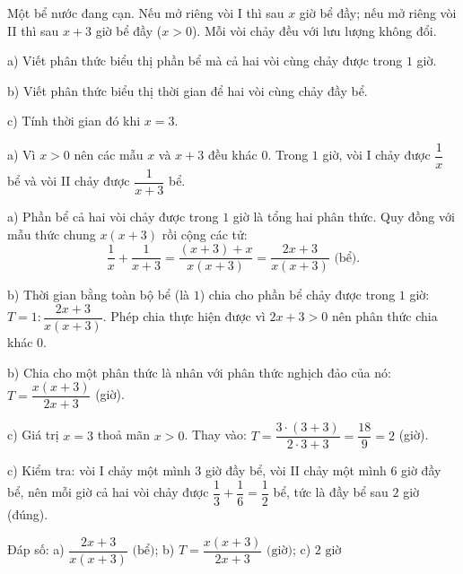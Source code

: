 \begin{problem}[8DS-PS-040]
Một bể nước đang cạn. Nếu mở riêng vòi I thì sau $x$ giờ bể đầy; nếu mở riêng vòi II thì sau $x + 3$ giờ bể đầy ($x > 0$). Mỗi vòi chảy đều với lưu lượng không đổi.

a) Viết phân thức biểu thị phần bể mà cả hai vòi cùng chảy được trong $1$ giờ.

b) Viết phân thức biểu thị thời gian để hai vòi cùng chảy đầy bể.

c) Tính thời gian đó khi $x = 3$.

\begin{solution}
a) Vì $x > 0$ nên các mẫu $x$ và $x + 3$ đều khác $0$. Trong $1$ giờ, vòi I chảy được $\dfrac{1}{x}$ bể và vòi II chảy được $\dfrac{1}{x + 3}$ bể.

a) Phần bể cả hai vòi chảy được trong $1$ giờ là tổng hai phân thức. Quy đồng với mẫu thức chung $x(x + 3)$ rồi cộng các tử:
\[ \dfrac{1}{x} + \dfrac{1}{x + 3} = \dfrac{(x + 3) + x}{x(x + 3)} = \dfrac{2x + 3}{x(x + 3)} \text{ (bể)}. \]

b) Thời gian bằng toàn bộ bể (là $1$) chia cho phần bể chảy được trong $1$ giờ: $T = 1 : \dfrac{2x + 3}{x(x + 3)}$. Phép chia thực hiện được vì $2x + 3 > 0$ nên phân thức chia khác $0$.

b) Chia cho một phân thức là nhân với phân thức nghịch đảo của nó: $T = \dfrac{x(x + 3)}{2x + 3}$ (giờ).

c) Giá trị $x = 3$ thoả mãn $x > 0$. Thay vào: $T = \dfrac{3 \cdot (3 + 3)}{2 \cdot 3 + 3} = \dfrac{18}{9} = 2$ (giờ).

c) Kiểm tra: vòi I chảy một mình $3$ giờ đầy bể, vòi II chảy một mình $6$ giờ đầy bể, nên mỗi giờ cả hai vòi chảy được $\dfrac{1}{3} + \dfrac{1}{6} = \dfrac{1}{2}$ bể, tức là đầy bể sau $2$ giờ (đúng).

Đáp số: a) $\boxed{\dfrac{2x + 3}{x(x + 3)} \text{ (bể)}}$; b) $\boxed{T = \dfrac{x(x + 3)}{2x + 3} \text{ (giờ)}}$; c) $\boxed{2 \text{ giờ}}$
\end{solution}
\end{problem}

